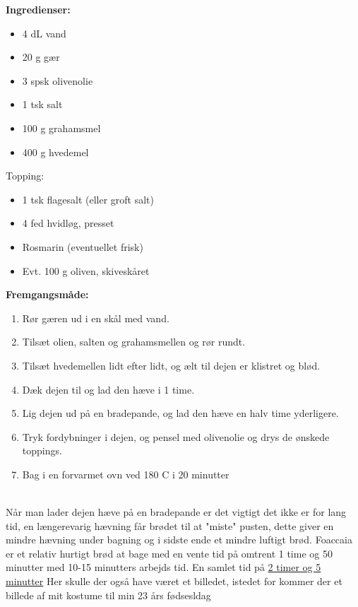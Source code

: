 \documentclass{book}
\begin{document}
\begin{minipage}[t]{0.5\textwidth}
\textbf{Ingredienser:}
\begin{itemize}
    \item 4 dL vand
    \item 20 g gær
    \item 3 spsk olivenolie
    \item 1 tsk salt
    \item 100 g grahamsmel
    \item 400 g hvedemel
\end{itemize}
Topping:
\begin{itemize}
    \item 1 tsk flagesalt (eller groft salt)
    \item 4 fed hvidløg, presset
    \item Rosmarin (eventuellet frisk)
    \item Evt. 100 g oliven, skiveskåret
    
\end{itemize}
\end{minipage}
\begin{minipage}[t]{0.5\textwidth}
\textbf{Fremgangsmåde:}
\begin{enumerate}
    \item Rør gæren ud i en skål med vand.
    \item Tilsæt olien, salten og grahamsmellen og rør rundt.
    \item Tilsæt hvedemellen lidt efter lidt, og ælt til dejen er klistret og blød.
    \item Dæk dejen til og lad den hæve i 1 time.
    \item Lig dejen ud på en bradepande, og lad den hæve en halv time yderligere.
    \item Tryk fordybninger i dejen, og pensel med olivenolie og drys de ønskede toppings.
    \item Bag i en forvarmet ovn ved 180 \degree C i 20 minutter
\end{enumerate}
\end{minipage}
\\ Når man lader dejen hæve på en bradepande er det vigtigt det ikke er for lang tid, en længerevarig hævning får brødet til at "miste" pusten, dette giver en mindre hævning under bagning og i sidste ende et mindre luftigt brød. 
Foaccaia er et relativ hurtigt brød at bage med en vente tid på omtrent 1 time og 50 minutter med 10-15 minutters arbejds tid. En samlet tid på \underline{2 timer og 5 minutter}
\newpage Her skulle der også have været et billedet, istedet for kommer der et billede af mit kostume til min 23 års fødsesldag 
\end{document}
